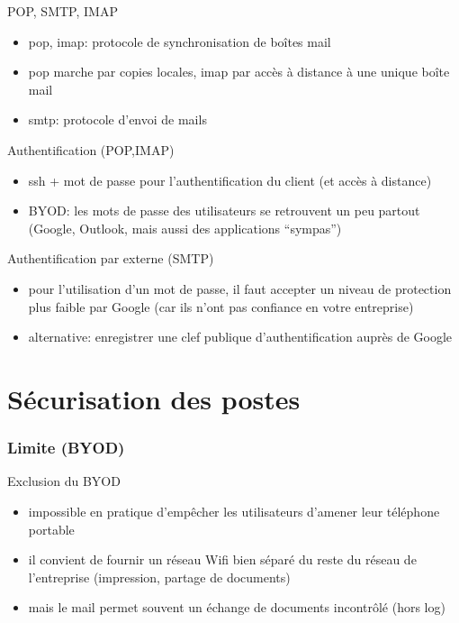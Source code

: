 \begin{reveals}
\begin{frame}
   \begin{block}{POP, SMTP, IMAP}
     \begin{itemize}
     \item pop, imap: protocole de synchronisation de boîtes mail
     \item pop marche par copies locales, imap par accès à distance à
       une unique boîte mail
     \item smtp: protocole d'envoi de mails
     \end{itemize}
  \end{block}

  \vfill

\begin{block}{Authentification (POP,IMAP)}
  \begin{itemize}
  \item ssh + mot de passe pour l'authentification du client (et accès à distance)
  \item BYOD: les mots de passe des utilisateurs se retrouvent un peu
    partout (Google, Outlook, mais aussi des applications ``sympas'')
  \end{itemize}
  \end{block}

  \vfill
\begin{block}{Authentification par externe (SMTP)}
  \begin{itemize}
  \item pour l'utilisation d'un mot de passe, il faut accepter un
    niveau de protection plus faible par Google (car ils n'ont pas
    confiance en votre entreprise)
  \item alternative: enregistrer une clef publique d'authentification
    auprès de Google
  \end{itemize}
  \end{block}

  \vfill




\end{frame}



\section{Sécurisation des postes}

\begin{frame}
  \frametitle{Limite (BYOD)}

  \vfill

  \begin{block}{Exclusion du BYOD}
    \begin{itemize}
    \item impossible en pratique d'empêcher les utilisateurs d'amener
      leur téléphone portable
    \item il convient de fournir un réseau Wifi bien séparé du reste
      du réseau de l'entreprise (impression, partage de documents)
    \item mais le mail permet souvent un échange de documents
      incontrôlé (hors log)
    \end{itemize}
  \end{block}


\end{frame}
\end{reveals}
